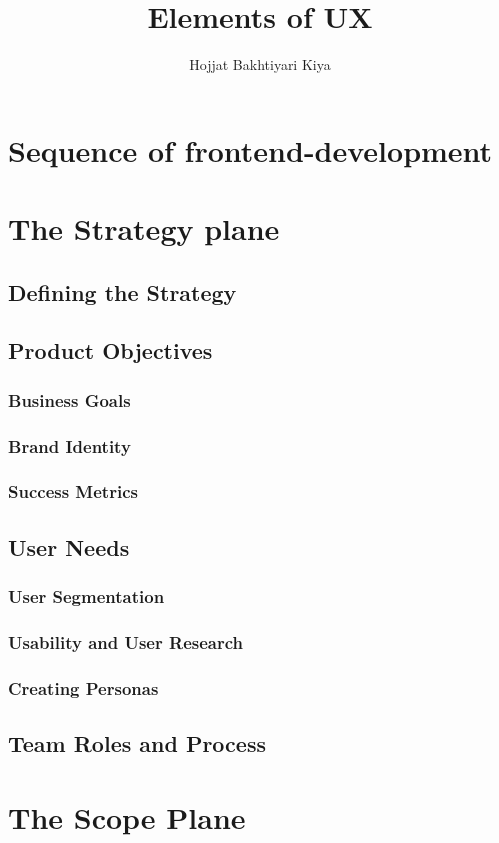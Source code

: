 \documentclass{book}
\author{Hojjat Bakhtiyari Kiya}
\title{Elements of UX}
\begin{document}
    \maketitle
    \chapter{Sequence of frontend-development}
    \chapter{The Strategy plane}
        \section{Defining the Strategy}
        \section{Product Objectives}
            \subsection{Business Goals}
            \subsection{Brand Identity}
            \subsection{Success Metrics}
        \section{User Needs}
            \subsection{User Segmentation}
            \subsection{Usability and User Research}
            \subsection{Creating Personas}
        \section{Team Roles and Process}
    \chapter{The Scope Plane}
\end{document}
